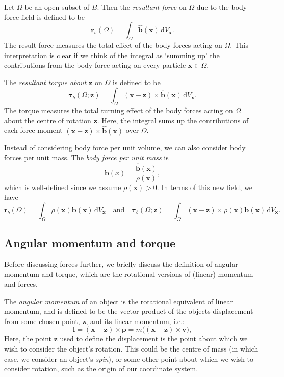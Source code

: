\documentclass[
  letterpaper,
  DIV=11,
  numbers=noendperiod]{scrreprt}
\theoremstyle{plain}
\theoremstyle{remark}
\begin{document}
Let \(\Omega\) be an open subset of \(B\). Then the \emph{resultant
force} on \(\Omega\) due to the body force field is defined to be
\[{\boldsymbol{r}}_b(\Omega) = \int_\Omega \widehat{{\boldsymbol{b}}}({\boldsymbol{x}}){\,{\mathrm{d}}V_{{\boldsymbol{x}}}}.\]
The result force measures the total effect of the body forces acting on
\(\Omega\). This interpretation is clear if we think of the integral as
`summing up' the contributions from the body force acting on every
particle \({\boldsymbol{x}}\in \Omega\).

The \emph{resultant torque about \({\boldsymbol{z}}\)} on \(\Omega\) is
defined to be
\[{\boldsymbol{\tau}}_b(\Omega;{\boldsymbol{z}}) = \int_\Omega ({\boldsymbol{x}}-{\boldsymbol{z}})\times \widehat{{\boldsymbol{b}}}({\boldsymbol{x}}){\,{\mathrm{d}}V_{{\boldsymbol{x}}}}.\]
The torque measures the total turning effect of the body forces acting
on \(\Omega\) about the centre of rotation \({\boldsymbol{z}}\). Here,
the integral sums up the contributions of each force moment
\(({\boldsymbol{x}}-{\boldsymbol{z}})\times\widehat{{\boldsymbol{b}}}({\boldsymbol{x}})\)
over \(\Omega\).

Instead of considering body force per unit volume, we can also consider
body forces per unit mass. The \emph{body force per unit mass} is
\[{\boldsymbol{b}}(x) = \frac{\widehat{{\boldsymbol{b}}}({\boldsymbol{x}})}{\rho({\boldsymbol{x}})},\]
which is well-defined since we assume \(\rho({\boldsymbol{x}})>0\). In
terms of this new field, we have
\[{\boldsymbol{r}}_b(\Omega) = \int_\Omega \rho({\boldsymbol{x}}){\boldsymbol{b}}({\boldsymbol{x}}){\,{\mathrm{d}}V_{{\boldsymbol{x}}}}\quad\text{and}\quad
  {\boldsymbol{\tau}}_b(\Omega;{\boldsymbol{z}}) = \int_\Omega ({\boldsymbol{x}}-{\boldsymbol{z}})\times \rho({\boldsymbol{x}}){\boldsymbol{b}}({\boldsymbol{x}}){\,{\mathrm{d}}V_{{\boldsymbol{x}}}}.\]

\subsection{Angular momentum and
torque}\label{angular-momentum-and-torque}

Before discussing forces further, we briefly discuss the definition of
angular momentum and torque, which are the rotational versions of
(linear) momentum and forces.

The \emph{angular momentum} of an object is the rotational equivalent of
linear momentum, and is defined to be the vector product of the objects
displacement from some chosen point, \({\boldsymbol{z}}\), and its
linear momentum, i.e.:
\[{\boldsymbol{l}}= ({\boldsymbol{x}}-{\boldsymbol{z}})\times{\boldsymbol{p}}= m\big(({\boldsymbol{x}}-{\boldsymbol{z}})\times{\boldsymbol{v}}\big),\]
Here, the point \({\boldsymbol{z}}\) used to define the displacement is
the point about which we wish to consider the object's rotation. This
could be the centre of mass (in which case, we consider an object's
\emph{spin}), or some other point about which we wish to consider
rotation, such as the origin of our coordinate system.
\end{document}
